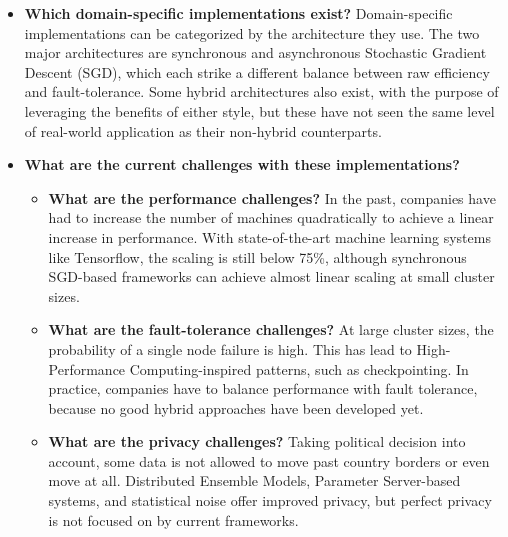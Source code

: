\begin{itemize}
	\begin{itemize}
		\item \textbf{Which domain-specific implementations exist?}
		Domain-specific implementations can be categorized by the architecture they use. The two major architectures are synchronous and asynchronous Stochastic Gradient Descent (SGD), which each strike a different balance between raw efficiency and fault-tolerance. Some hybrid architectures also exist, with the purpose of leveraging the benefits of either style, but these have not seen the same level of real-world application as their non-hybrid counterparts.
		\item \textbf{What are the current challenges with these implementations?}
		\begin{itemize}
			\item \textbf{What are the performance challenges?} In the past, companies have had to increase the number of machines quadratically to achieve a linear increase in performance. With state-of-the-art machine learning systems like Tensorflow, the scaling is still below 75\%, although synchronous SGD-based frameworks can achieve almost linear scaling at small cluster sizes.
			\item \textbf{What are the fault-tolerance challenges?} At large cluster sizes, the probability of a single node failure is high. This has lead to High-Performance Computing-inspired patterns, such as checkpointing. In practice, companies have to balance performance with fault tolerance, because no good hybrid approaches have been developed yet.
			\item \textbf{What are the privacy challenges?} Taking political decision into account, some data is not allowed to move past country borders or even move at all. Distributed Ensemble Models, Parameter Server-based systems, and statistical noise offer improved privacy, but perfect privacy is not focused on by current frameworks.
		\end{itemize}
	\end{itemize}
\end{itemize}
